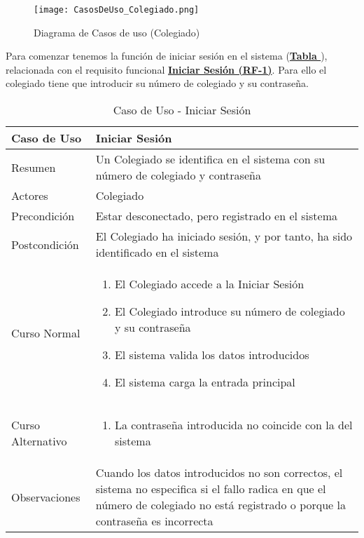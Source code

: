 \begin{figure}[!htbp]
  \centering
  \texttt{[image: CasosDeUso\_Colegiado.png]}
  \caption{Diagrama de Casos de uso (Colegiado)}
  \label{fig:CasosDeUso_Colegiado}
\end{figure}
\FloatBarrier

\addtocounter{tabla}{1}
Para comenzar tenemos la función de iniciar sesión en el sistema (\textbf{\hyperref[tab:cucIniSes]{Tabla }}), relacionada con el requisito funcional \textbf{\hyperref[tab:rfIniSes]{Iniciar Sesión (RF-1)}}. Para ello el colegiado tiene que introducir su número de colegiado y su contraseña.

\begin{table}[!htbp]
  \centering  \addtocounter{casouso}{1}
  \begin{tabular}{|l | p{100mm}|}
    \textbf{Caso de Uso}  & \textbf{Iniciar Sesión} \\ \hline
    Resumen 		 & Un Colegiado se identifica en el sistema con su número de colegiado y contraseña \\ \hline
    Actores  		 & Colegiado \\ \hline
    Precondición  	 & Estar desconectado, pero registrado en el sistema \\ \hline
    Postcondición  	 & El Colegiado ha iniciado sesión, y por tanto, ha sido identificado en el sistema \\ \hline
    Curso Normal   	 & \begin{enumerate}
	  \item El Colegiado accede a la Iniciar Sesión
	  \item El Colegiado introduce su número de colegiado y su contraseña
	  \item El sistema valida los datos introducidos
	  \item El sistema carga la entrada principal
    \end{enumerate}  \\ \hline
    Curso Alternativo  & \begin{enumerate}
	  \item La contraseña introducida no coincide con la del sistema
    \end{enumerate}  \\ \hline
    Observaciones 	 & Cuando los datos introducidos no son correctos, el sistema no especifica si el fallo radica en que el número de colegiado no está registrado o porque la contraseña es incorrecta  \\ \hline
  \end{tabular}
  \caption{Caso de Uso  - Iniciar Sesión}
  \label{tab:cucIniSes}
\end{table}
\FloatBarrier

